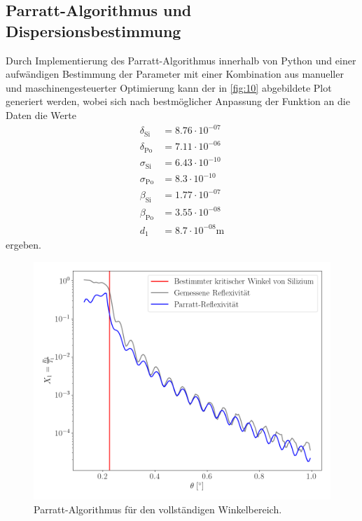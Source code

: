 \documentclass[12pt]{article}
\begin{document}
\subsection{Parratt-Algorithmus und Dispersionsbestimmung}
Durch Implementierung des Parratt-Algorithmus innerhalb von Python und einer aufwändigen Bestimmung der Parameter mit einer Kombination aus manueller und maschinengesteuerter Optimierung kann der in \autoref{fig:10} abgebildete Plot generiert werden, wobei sich nach bestmöglicher Anpassung der Funktion an die Daten die Werte
\begin{align*}
  \delta_\text{Si}  &=\num{8.76}\cdot10^{-07} \\  %
  \delta_\text{Po}  &=\num{7.11}\cdot10^{-06} \\  %
  \sigma_\text{Si}  &=\num{6.43}\cdot10^{-10} \\  %
  \sigma_\text{Po}  &=\num{8.3}\cdot10^{-10} \\  %
  \beta_\text{Si}   &=\num{1.77}\cdot10^{-07} \\  %
  \beta_\text{Po}   &=\num{3.55}\cdot10^{-08} \\  %
  d_1               &=\num{8.7}\cdot10^{-08}\si{\meter}  %
\end{align*}
ergeben.
\begin{figure}[H]
  \centering
  \includegraphics[scale=0.5]{Ressourcen/parratttipp.png}
  \caption{Parratt-Algorithmus für den vollständigen Winkelbereich.}\label{fig:10}
\end{figure}
\end{document}
